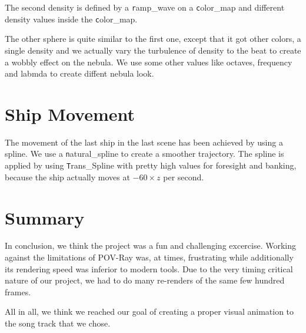 \documentclass[a4paper, 12pt]{scrartcl}
\begin{document}
    The second density is defined by a \texttt ramp\_wave on a \texttt color\_map and different density
    values inside the \texttt color\_map.

    The other sphere is quite similar to the first one, except that it got other colors, a single
    density and we actually vary the turbulence of density to the beat to create a wobbly effect on
    the nebula.  We use some other values like octaves, frequency and labmda to create diffent
    nebula look.

    \section{Ship Movement}
    \label{sec:spline}

    The movement of the last ship in the last scene has been achieved by using a spline. We use a
    \texttt natural\_spline to create a smoother trajectory. The spline is applied by using \texttt
    Trans\_Spline with pretty high values for foresight and banking, because the ship actually
    moves at \(-60 \times z\) per second.

    \section{Summary}

    In conclusion, we think the project was a fun and challenging excercise. Working against the
    limitations of POV-Ray was, at times, frustrating while additionally its rendering speed was
    inferior to modern tools. Due to the very timing critical nature of our project, we had to do
    many re-renders of the same few hundred frames.

    All in all, we think we reached our goal of creating a proper visual animation to the song
    track that we chose.
\end{document}
